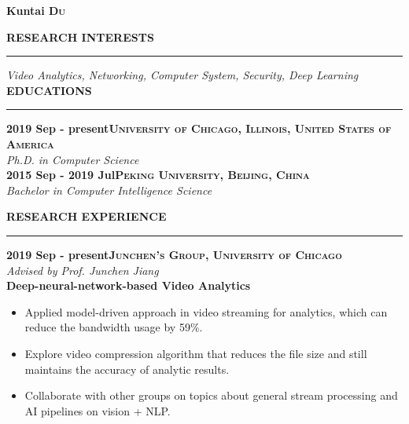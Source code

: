 \documentclass[a4paper,10pt,final]{memoir}
\newcommand{\myThemeColor}{Maroon}
\newcommand{\SmallSep}{\vspace{0.9em}}
\newcommand{\smallsep}{\vspace{0.45em}}
\newcommand{\CVSection}[1]
	{\large\textbf{\textsf{#1}}\par
	\smallsep\normalsize\normalfont}
\newcommand{\CVItem}[1]
	{\textbf{\color{\myThemeColor} #1}}
\begin{document}




\Huge\bfseries {\color{\myThemeColor} Kuntai \textsc{Du}}
\normalsize\normalfont
{}
~~~
~~~
\\


\SmallSep

\CVSection{RESEARCH INTERESTS}
\hrule
\SmallSep
\textit{Video Analytics, Networking, Computer System, Security, Deep Learning}
\\

\CVSection{EDUCATIONS}
\hrule
\SmallSep
\CVItem{2019 Sep - present\hfill\textsc{University of Chicago, Illinois, United States of America}}\\
\textit{Ph.D. in Computer Science}\\
\CVItem{2015 Sep - 2019 Jul\hfill\textsc{Peking University, Beijing, China}}\\
\textit{Bachelor in Computer Intelligence Science}


\SmallSep
\CVSection{RESEARCH EXPERIENCE}
\hrule
\smallsep
\CVItem{2019 Sep - present\hfill\textsc{Junchen's Group, University of Chicago}}\\
\textit{Advised by Prof. Junchen Jiang}\\
\textbf{Deep-neural-network-based Video Analytics}
\vspace{-0.5em}
\begin{itemize}
    \vspace{-0.5em}
	\setlength{\itemsep}{0pt}
	\setlength{\parsep}{0pt}
	\setlength{\parskip}{0pt}
    \item Applied model-driven approach in video streaming for analytics, which can reduce the bandwidth usage by 59\%.
    \item Explore video compression algorithm that reduces the file size and still maintains the accuracy of analytic results.
    \item Collaborate with other groups on topics about general stream processing and AI pipelines on vision + NLP.
\end{itemize}
\smallsep
\end{document}
